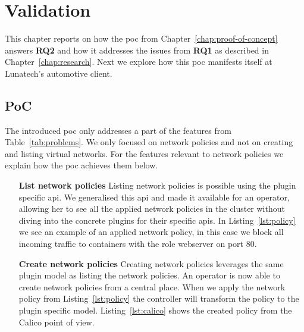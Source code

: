 \chapter{Validation}
\label{chap:validation}
This chapter reports on how the \gls{poc} from Chapter~\ref{chap:proof-of-concept} answers \textbf{RQ2} and how it addresses the issues from \textbf{RQ1} as described in Chapter~\ref{chap:research}. Next we explore how this \gls{poc} manifests itself at Lunatech's automotive client.

\section{PoC}
The introduced \gls{poc} only addresses a part of the features from Table~\ref{tab:problems}. We only focused on network policies and not on creating and listing virtual networks. For the features relevant to network policies we explain how the \gls{poc} achieves them below.
\begin{itemize}
    \item[\textbf{List network policies}] Listing network policies is possible using the plugin specific \gls{api}. We generalised this \gls{api} and made it available for an operator, allowing her to see all the applied network policies in the cluster without diving into the concrete plugins for their specific \glspl{api}. In Listing~\ref{lst:policy} we see an example of an applied network policy, in this case we block all incoming traffic to containers with the role webserver on port 80.
    
    \item[\textbf{Create network policies}] Creating network policies leverages the same plugin model as listing the network policies. An operator is now able to create network policies from a central place. When we apply the network policy from Listing~\ref{lst:policy} the controller will transform the policy to the plugin specific model. Listing~\ref{lst:calico} shows the created policy from the Calico point of view.
    
\end{itemize}


